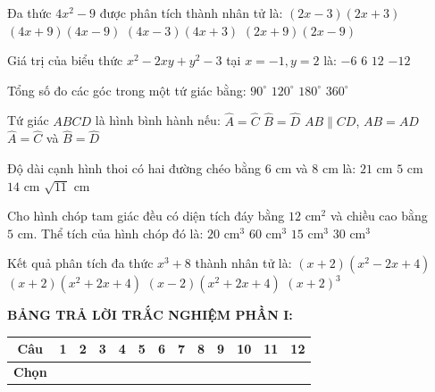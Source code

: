 \documentclass[12pt,a4paper]{article}
\begin{document}
\begin{ex}
Đa thức $4x^2 - 9$ được phân tích thành nhân tử là:
\choice
{\True $(2x - 3)(2x + 3)$}
{$(4x + 9)(4x - 9)$}
{$(4x - 3)(4x + 3)$}
{$(2x + 9)(2x - 9)$}
\end{ex}

\begin{ex}
Giá trị của biểu thức $x^2 - 2xy + y^2 - 3$ tại $x = -1, y = 2$ là:
\choice
{$-6$}
{\True $6$}
{$12$}
{$-12$}
\end{ex}

\begin{ex}
Tổng số đo các góc trong một tứ giác bằng:
\choice
{$90^\circ$}
{$120^\circ$}
{$180^\circ$}
{\True $360^\circ$}
\end{ex}

\begin{ex}
Tứ giác $ABCD$ là hình bình hành nếu:
\choice
{$\widehat{A} = \widehat{C}$}
{$\widehat{B} = \widehat{D}$}
{$AB \parallel CD$, $AB = AD$}
{\True $\widehat{A} = \widehat{C}$ và $\widehat{B} = \widehat{D}$}
\end{ex}

\begin{ex}
Độ dài cạnh hình thoi có hai đường chéo bằng $6\text{ cm}$ và $8\text{ cm}$ là:
\choice
{$21\text{ cm}$}
{\True $5\text{ cm}$}
{$14\text{ cm}$}
{$\sqrt{11}\text{ cm}$}
\end{ex}

\begin{ex}
Cho hình chóp tam giác đều có diện tích đáy bằng $12\text{ cm}^2$ và chiều cao bằng $5\text{ cm}$. Thể tích của hình chóp đó là:
\choice
{\True $20\text{ cm}^3$}
{$60\text{ cm}^3$}
{$15\text{ cm}^3$}
{$30\text{ cm}^3$}
\end{ex}

\begin{ex}
Kết quả phân tích đa thức $x^3 + 8$ thành nhân tử là:
\choice
{\True $(x + 2)(x^2 - 2x + 4)$}
{$(x + 2)(x^2 + 2x + 4)$}
{$(x - 2)(x^2 + 2x + 4)$}
{$(x + 2)^3$}
\end{ex}


\vspace{1mm}
\noindent\textbf{BẢNG TRẢ LỜI TRẮC NGHIỆM PHẦN I:}
\begin{center}
\begin{tabular}{|c|c|c|c|c|c|c|c|c|c|c|c|c|}
\hline
\textbf{Câu} & \textbf{1} & \textbf{2} & \textbf{3} & \textbf{4} & \textbf{5} & \textbf{6} & \textbf{7} & \textbf{8} & \textbf{9} & \textbf{10} & \textbf{11} & \textbf{12} \\
\hline
\textbf{Chọn} & \rule{0pt}{0.65cm} & & & & & & & & & & & \\
\hline
\end{tabular}
\end{center}
\vspace{2mm}
\end{document}

